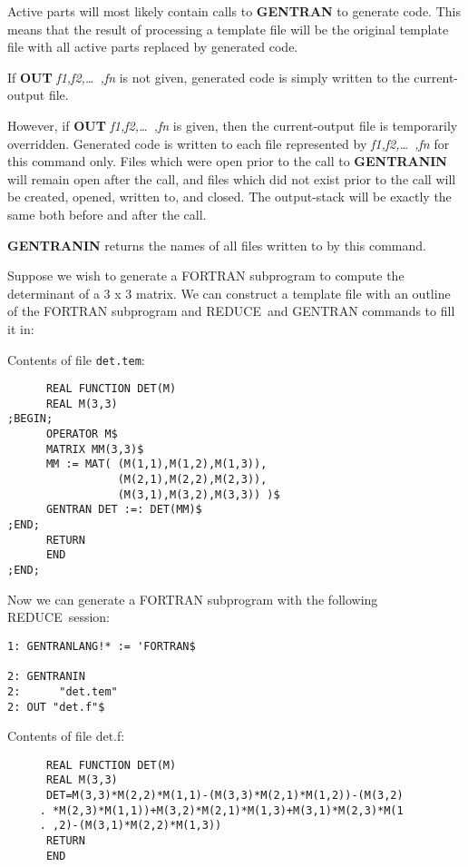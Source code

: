 \documentclass[11pt,letterpaper]{book}
\newcommand{\REDUCE}{REDUCE}
\newenvironment{describe}[1]{\par{\bf #1}\begin{indented}}{\end{indented}}
\begin{document}
Active parts will most likely contain calls to {\bf GENTRAN} to
generate code.  This means that the result of processing a
template file will be the original template file with all active
parts replaced by generated code.

If {\bf OUT} {\it f1,f2,\dots\ ,fn} is not given, generated code is simply
written to the current-output file.

However, if {\bf OUT} {\it  f1,f2,\dots\ ,fn}
is given, then the current-output file
is temporarily overridden.  Generated code is written to each file
represented by {\it f1,f2,\dots\ ,fn} for this command only.  Files
which were open prior to the call to {\bf GENTRANIN} will remain open
after the call, and files which did not exist prior to the call will
be created, opened, written to, and closed.  The output-stack will be
exactly the same both before and after the call.


{\bf GENTRANIN} returns the names of all files written to by this
command.
\newpage
\begin{describe}{\example}
Suppose we wish to generate a FORTRAN subprogram to compute the
determinant of a 3 x 3 matrix.  We can construct a template
file with an outline of the FORTRAN subprogram and \REDUCE\ and
GENTRAN commands to fill it in:

Contents of file {\tt det.tem}:
\end{describe}
{\small\begin{verbatim}
      REAL FUNCTION DET(M)
      REAL M(3,3)
;BEGIN;
      OPERATOR M$
      MATRIX MM(3,3)$
      MM := MAT( (M(1,1),M(1,2),M(1,3)),
                 (M(2,1),M(2,2),M(2,3)),
                 (M(3,1),M(3,2),M(3,3)) )$
      GENTRAN DET :=: DET(MM)$
;END;
      RETURN
      END
;END;
\end{verbatim}}

\begin{describe}{}
Now we can generate a FORTRAN subprogram with the following
\REDUCE\ session:
{\small\begin{verbatim}
1: GENTRANLANG!* := 'FORTRAN$

2: GENTRANIN
2:      "det.tem"
2: OUT "det.f"$
\end{verbatim}}
Contents of file det.f:
\end{describe}
{\small\begin{verbatim}
      REAL FUNCTION DET(M)
      REAL M(3,3)
      DET=M(3,3)*M(2,2)*M(1,1)-(M(3,3)*M(2,1)*M(1,2))-(M(3,2)
     . *M(2,3)*M(1,1))+M(3,2)*M(2,1)*M(1,3)+M(3,1)*M(2,3)*M(1
     . ,2)-(M(3,1)*M(2,2)*M(1,3))
      RETURN
      END
\end{verbatim}}
\end{document}

